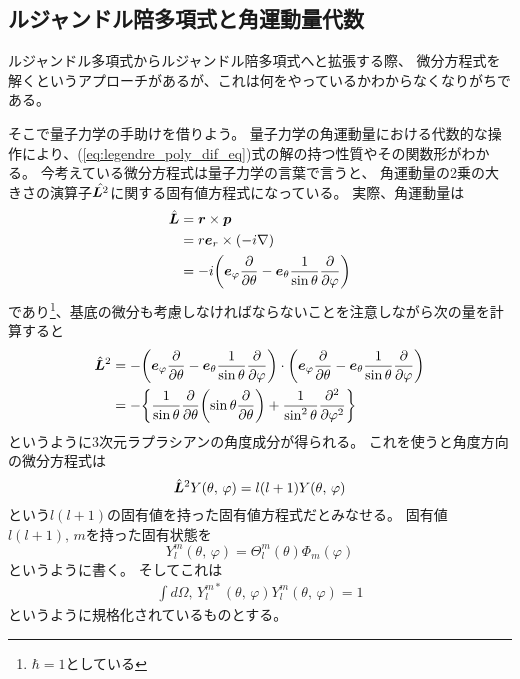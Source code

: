 \documentclass[../../master.tex]{subfiles}
\begin{document}
\subsection{ルジャンドル陪多項式と角運動量代数}
ルジャンドル多項式からルジャンドル陪多項式へと拡張する際、
微分方程式を解くというアプローチがあるが、これは何をやっているかわからなくなりがちである。

そこで量子力学の手助けを借りよう。
量子力学の角運動量における代数的な操作により、(\ref{eq:legendre_poly_dif_eq})式の解の持つ性質やその関数形がわかる。
今考えている微分方程式は量子力学の言葉で言うと、
角運動量の2乗の大きさの演算子\(\hat{\vb*{L}^2}\)に関する固有値方程式になっている。
実際、角運動量は
\begin{align}
	\hat{\vb*{L}} & = \vb*{r} \times \vb*{p}                                                                 \\
	              & = r\vb*{e}_r \times \qty(-i\nabla)                                                       \\
	              & =-i\qty(\vb*{e}_{\varphi}\pdv{\theta}-\vb*{e}_{\theta}\frac{1}{\sin\theta}\pdv{\varphi})
\end{align}
であり\footnote{\(\hbar=1\)としている}、基底の微分も考慮しなければならないことを注意しながら次の量を計算すると
\begin{align}
	\hat{\vb*{L}}^2 & = -\qty(\vb*{e}_{\varphi}\pdv{\theta}-\vb*{e}_{\theta}\frac{1}{\sin\theta}\pdv{\varphi})\cdot\qty(\vb*{e}_{\varphi}\pdv{\theta}-\vb*{e}_{\theta}\frac{1}{\sin\theta}\pdv{\varphi}) \\
	                & = -\qty{\frac{1}{\sin\theta}\pdv{\theta}\qty(\sin\theta\pdv{\theta})+\frac{1}{\sin^2\theta}\pdv[2]{\varphi}}
\end{align}
というように3次元ラプラシアンの角度成分が得られる。
これを使うと角度方向の微分方程式は
\begin{equation}
	\hat{\vb*{L}}^2 Y(\theta,\,\varphi) = l(l+1) Y(\theta,\,\varphi)
\end{equation}
という\(l(l+1)\)の固有値を持った固有値方程式だとみなせる。
固有値\(l(l+1),\,m\)を持った固有状態を
\begin{equation}
	Y_l^m(\theta,\,\varphi) = \Theta_l^m(\theta)\Phi_m(\varphi)
\end{equation}
というように書く。
そしてこれは
\begin{align}
	\int d\Omega ,\, Y_{l}^{m*}(\theta,\,\varphi)Y_{l}^m(\theta,\,\varphi) = 1
\end{align}
というように規格化されているものとする。
\end{document}
